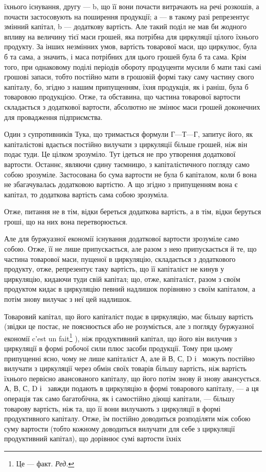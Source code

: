 \parcont{}  %
їхнього існування, другу — b, що її вони почасти витрачають на речі
розкошів, а почасти застосовують на поширення продукції; а — в такому
разі репрезентує змінний капітал, b — додаткову вартість. Але такий поділ
не мав би жодного впливу на величину тієї маси грошей, яка потрібна
для циркуляції цілого їхнього продукту. За інших незмінних умов, вартість
товарової маси, що циркулює, була б та сама, а значить, і маса
потрібних для цього грошей була б та сама. Крім того, при однаковому
поділі періодів обороту продуценти мусили б мати такі самі грошові запаси,
тобто постійно мати в грошовій формі таку саму частину свого
капіталу, бо, згідно з нашим припущенням, їхня продукція, як і раніш,
була б товаровою продукцією. Отже, та обставина, що частина товарової
вартости складається з додаткової вартости, абсолютно не змінює маси
грошей доконечних для провадження підприємства.

Один з супротивників Тука, що тримається формули $Г — Т — Г$, запитує
його, як капіталістові вдається постійно вилучати з циркуляції більше
грошей, ніж він подає туди. Це цілком зрозуміло. Тут ідеться не про
утворення додаткової вартости. Останнє, являючи єдину таємницю, з
капіталістичного погляду само собою зрозуміле. Застосована бо сума вартости
не була б капіталом, коли б вона не збагачувалась додатковою
вартістю. А що згідно з припущенням вона є капітал, то додаткова вартість
сама собою зрозуміла.

Отже, питання не в тім, відки береться додаткова вартість, а в тім,
відки беруться гроші, що на них вона перетворюється.

Але для буржуазної економії існування додаткової вартости зрозуміле
само собою. Отже, її не лише припускається, але разом з нею припускається
й те, що частина товарової маси, пущеної в циркуляцію, складається
з додаткового продукту, отже, репрезентує таку вартість, що її капіталіст
не кинув у циркуляцію, кидаючи туди свій капітал; що, отже, капіталіст,
разом з своїм продуктом кидає в циркуляцію певний надлишок
порівняно з своїм капіталом, а потім знову вилучає з неї цей надлишок.

Товаровий капітал, що його капіталіст подає в циркуляцію, має більшу
вартість (звідки це постає, не пояснюється або не розуміється, але з
погляду буржуазної економії c’est un fait\footnote*{
Це — факт. \emph{Ред.}
} ), ніж продуктивний капітал,
що його він вилучив з циркуляції в формі робочої сили плюс засоби
продукції. Тому при цьому припущенні ясно, чому не лише капіталіст
А, але й В, С, D і~ можуть постійно вилучати з циркуляції через
обмін своїх товарів більшу вартість, ніж вартість їхнього первісно авансованого
капіталу, що його потім знову й знову авансується. А, В, С,
D і~ завжди подають в циркуляцію в формі товарового капіталу, —
а ця операція так само багатобічна, як і самостійно діющі капітали, —
більшу товарову вартість, ніж та, що її вони вилучають з циркуляції в
формі продуктивного капіталу. Отже, їм постійно доводиться розподіляти
між собою суму вартости (тобто кожному доводиться вилучати для себе
з циркуляції продуктивний капітал), що дорівнює сумі вартости їхніх
\parbreak{}  %
